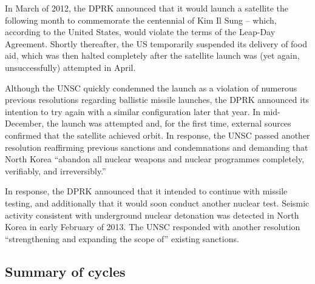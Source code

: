 \documentclass{article}
\begin{document}
In March of 2012, the DPRK announced that it would launch a satellite the following month to commemorate the centennial of Kim Il Sung – which, according to the United States, would violate the terms of the Leap-Day Agreement\cite{davenport}. Shortly thereafter, the US temporarily suspended its delivery of food aid, which was then halted completely after the satellite launch was (yet again, unsuccessfully) attempted in April\cite{davenport}.

Although the UNSC quickly condemned the launch as a violation of numerous previous resolutions regarding ballistic missile launches\cite{unsc12}, the DPRK announced its intention to try again with a similar configuration later that year. In mid-December, the launch was attempted and, for the first time, external sources confirmed that the satellite achieved orbit\cite{davenport}. In response, the UNSC passed another resolution reaffirming previous sanctions and condemnations and demanding that North Korea “abandon all nuclear weapons and nuclear programmes completely, verifiably, and irreversibly.” \cite{unsc13}

In response, the DPRK announced that it intended to continue with missile testing, and additionally that it would soon conduct another nuclear test\cite{davenport}. Seismic activity consistent with underground nuclear detonation was detected in North Korea in early February of 2013\cite{davenport}. The UNSC responded with another resolution “strengthening and expanding the scope of” existing sanctions\cite{unsc13m}.

\subsection{Summary of cycles}
\end{document}
